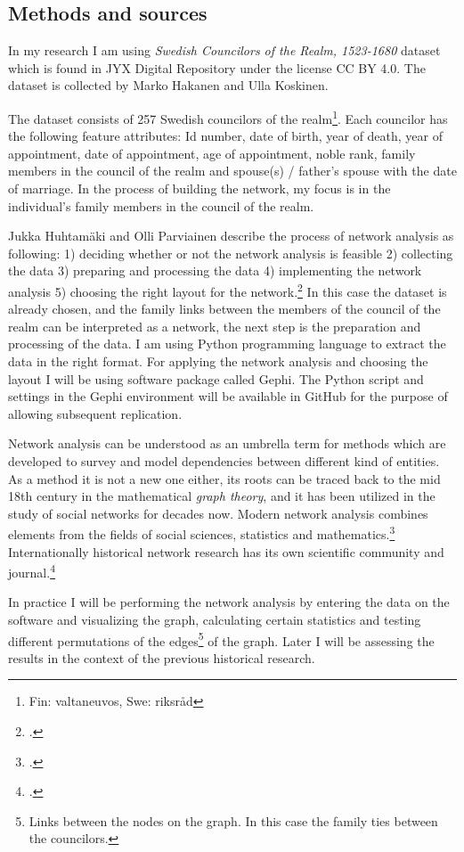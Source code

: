 \documentclass[a4paper,12pt]{article}
\begin{document}
\begin{onehalfspace}
\section{Methods and sources}
In my research I am using \textit{Swedish Councilors of the Realm, 1523-1680} dataset which is found in JYX Digital Repository under the license CC BY 4.0. The dataset is collected by Marko Hakanen and Ulla Koskinen. 

The dataset consists of 257 Swedish councilors of the realm\footnote{Fin: valtaneuvos, Swe: riksråd}. Each councilor has the following feature attributes: Id number, date of birth, year of death, year of appointment, date of appointment, age of appointment, noble rank, family members in the council of the realm and spouse(s) / father's spouse with the date of marriage. In the process of building the network, my focus is in the individual's family members in the council of the realm. 

Jukka Huhtamäki and Olli Parviainen describe the process of network analysis as following: 1) deciding whether or not the network analysis is feasible 2) collecting the data 3) preparing and processing the data 4) implementing the network analysis 5) choosing the right layout for the network.\footcite[p. 258 - 264.]{verkostanalyysisome} In this case the dataset is already chosen, and the family links between the members of the council of the realm can be interpreted as a network, the next step is the preparation and processing of the data. I am using Python programming language to extract the data in the right format. For applying the network analysis and choosing the layout I will be using software package called Gephi. The Python script and settings in the Gephi environment will be available in GitHub for the purpose of allowing subsequent replication.

Network analysis can be understood as an umbrella term for methods which are developed to survey and model dependencies between different kind of entities. As a method it is not a new one either, its roots can be traced back to the mid 18th century in the mathematical \textit{graph theory}, and it has been utilized in the study of social networks for decades now. Modern network analysis combines elements from the fields of social sciences, statistics and mathematics.\footcite[p. 246 - 247.]{verkostanalyysisome} Internationally historical network research has its own scientific community and journal.\footcite{hnr}

In practice I will be performing the network analysis by entering the data on the software and visualizing the graph, calculating certain statistics and testing different permutations of the edges\footnote{Links between the nodes on the graph. In this case the family ties between the councilors.} of the graph. Later I will be assessing the results in the context of the previous historical research. 


\end{onehalfspace}
\end{document}
